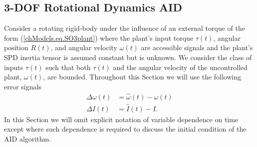 \subsection{3-\acs{DOF} Rotational Dynamics \acs{AID}} 
\label{chSMS_ID.sec.SO3_AID_Der}

\newcommand{\genericChar}{\psi}
 
Consider a rotating rigid-body under the influence of an
external torque of the form (\ref{chModels.eq.SO3plant}) where the
plant's input torque $\tau(t)$, angular position $R(t)$, and angular
velocity $\omega(t)$ are accessible signals and the plant's \ac{SPD}
inertia tensor is assumed constant but is unknown.
%
We consider the class of inputs $\tau(t)$ such that both
$\tau(t)$ and the angular velocity of the uncontrolled plant,
$\omega(t)$, are bounded.
%
Throughout this Section we will use the following error signals
%
\begin{align}
\Delta\omega(t)&=\hat{\omega}(t)-\omega(t)  \label{chSMS_ID.eq.SO3_AID_deltaw} \\
\Delta I(t)&=\hat{I}(t) - I.                \label{chSMS_ID.eq.SO3_AID_deltaI} 
\end{align}
%
In this Section we will omit explicit notation of variable
dependence on time except where such dependence is required to discuss
the initial condition of the \ac{AID} algorithm.
%




